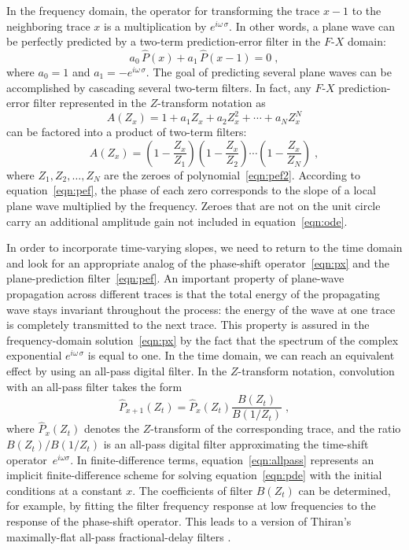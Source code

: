 In the frequency domain, the operator for transforming the trace  $x-1$ to the neighboring trace  $x$ is a multiplication by $e^{i
  \omega\,\sigma}$. In other words, a plane wave can be perfectly
predicted by a two-term prediction-error filter in the $F$-$X$ domain:
\begin{equation}
  \label{eqn:pef}
  a_0 \, \hat{P} (x) + a_1\, \hat{P} (x-1) = 0\;,
\end{equation}
where $a_0 = 1$ and $a_1 = - e^{i \omega\,\sigma}$. The goal of
predicting several plane waves can be accomplished by cascading
several two-term filters. In fact, any $F$-$X$ prediction-error
filter represented in the $Z$-transform notation as
\begin{equation}
  \label{eqn:pef2}
  A(Z_x) = 1 + a_1 Z_x + a_2 Z_x^2 + \cdots + a_N Z_x^N
\end{equation}
can be factored into a product of two-term filters:
\begin{equation}
  \label{eqn:pef3}
  A(Z_x) = \left(1 - \frac{Z_x}{Z_1}\right)\left(1 - \frac{Z_x}{Z_2}\right)
  \cdots\left(1 - \frac{Z_x}{Z_N}\right)\;,
\end{equation}
where $Z_1,Z_2,\ldots,Z_N$ are the zeroes of
polynomial~\ref{eqn:pef2}. According to equation~\ref{eqn:pef},
the phase of each zero corresponds to the slope of a local plane wave
multiplied by the frequency. Zeroes that are not on the unit circle
carry an additional amplitude gain not included in
equation~\ref{eqn:ode}.

In order to incorporate time-varying slopes, we need to return to
the time domain and look for an appropriate analog of the phase-shift
operator~\ref{eqn:px} and the plane-prediction
filter~\ref{eqn:pef}. An important property of plane-wave
propagation across different traces is that the total energy of the
propagating wave stays invariant throughout the process: the energy of 
the wave at one trace is completely transmitted to the next trace.
 This property
is assured in the frequency-domain solution~\ref{eqn:px} by the fact
that the spectrum of the complex exponential $e^{i \omega\,\sigma}$ is
equal to one.  In the time domain, we can reach an equivalent effect
by using an all-pass digital filter. In the $Z$-transform notation,
convolution with an all-pass filter takes the form
\begin{equation}
\label{eqn:allpass}
\hat{P}_{x+1}(Z_t) = \hat{P}_{x} (Z_t) \frac{B(Z_t)}{B(1/Z_t)}\;,
\end{equation}
where $\hat{P}_x (Z_t)$ denotes the $Z$-transform of the corresponding
trace, and the ratio $B(Z_t)/B(1/Z_t)$ is an all-pass digital filter
approximating the time-shift operator~$e^{i \omega \sigma}$. In
finite-difference terms, equation~\ref{eqn:allpass} represents an
implicit finite-difference scheme for solving equation~\ref{eqn:pde}
with the initial conditions at a constant $x$.  The coefficients of
filter $B(Z_t)$ can be determined, for example, by fitting the filter
frequency response at low frequencies to the response of the
phase-shift operator. This leads to a version of Thiran's
maximally-flat all-pass fractional-delay filters \cite[]{thiran,review}.

